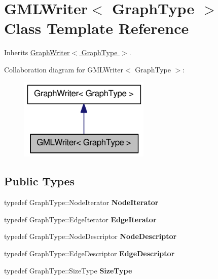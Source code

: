 \hypertarget{class_g_m_l_writer}{
\section{GMLWriter$<$ GraphType $>$ Class Template Reference}
\label{class_g_m_l_writer}
}


Inherits \hyperlink{class_graph_writer}{GraphWriter$<$ GraphType $>$}.



Collaboration diagram for GMLWriter$<$ GraphType $>$:\nopagebreak
\begin{figure}[H]
\begin{center}
\leavevmode
\includegraphics[width=176pt]{class_g_m_l_writer__coll__graph}
\end{center}
\end{figure}
\subsection*{Public Types}
\begin{DoxyCompactItemize}
\item 
\hypertarget{class_g_m_l_writer_a1481f608c17c82f9a3caa5d84bf606b0}{
typedef GraphType::NodeIterator {\bfseries NodeIterator}}
\label{class_g_m_l_writer_a1481f608c17c82f9a3caa5d84bf606b0}

\item 
\hypertarget{class_g_m_l_writer_a6ec46615ef9ead7d335b9a6be8f4d366}{
typedef GraphType::EdgeIterator {\bfseries EdgeIterator}}
\label{class_g_m_l_writer_a6ec46615ef9ead7d335b9a6be8f4d366}

\item 
\hypertarget{class_g_m_l_writer_a5807883d7c7c38af4bec085875abc695}{
typedef GraphType::NodeDescriptor {\bfseries NodeDescriptor}}
\label{class_g_m_l_writer_a5807883d7c7c38af4bec085875abc695}

\item 
\hypertarget{class_g_m_l_writer_a58db6fc9a003f79f840fa448851d4f1d}{
typedef GraphType::EdgeDescriptor {\bfseries EdgeDescriptor}}
\label{class_g_m_l_writer_a58db6fc9a003f79f840fa448851d4f1d}

\item 
\hypertarget{class_g_m_l_writer_a862be715e780590c1f64761f615b3a52}{
typedef GraphType::SizeType {\bfseries SizeType}}
\label{class_g_m_l_writer_a862be715e780590c1f64761f615b3a52}

\end{DoxyCompactItemize}

